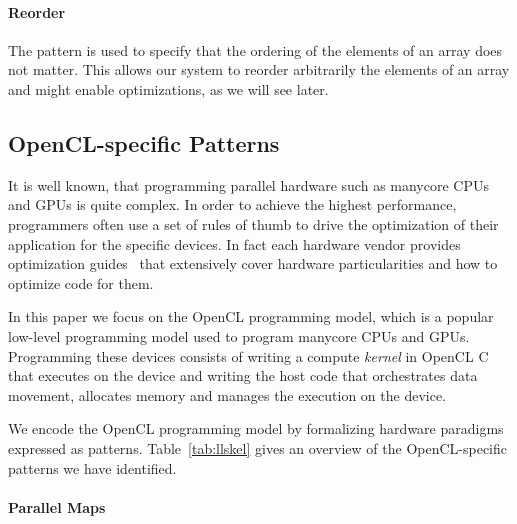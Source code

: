 \paragraph{Reorder}

The  pattern is used to specify that the ordering of the elements of an array does not matter.
This allows our system to reorder arbitrarily the elements of an array and might enable optimizations, as we will see later.



\subsection{OpenCL-specific Patterns}

It is well known, that programming parallel hardware such as manycore CPUs and GPUs is quite complex.
In order to achieve the highest performance, programmers often use a set of rules of thumb to drive the optimization of their application for the specific devices.
In fact each hardware vendor provides optimization guides~\cite{nvidia11guide,amd12guide} that extensively cover hardware particularities and how to optimize code for them.

In this paper we focus on the OpenCL programming model, which is a popular low-level programming model used to program manycore CPUs and GPUs.
Programming these devices consists of writing a compute \emph{kernel} in OpenCL C that executes on the device and writing the host code that orchestrates data movement, allocates memory and manages the execution on the device.

We encode the OpenCL programming model by formalizing hardware paradigms expressed as patterns.
Table~\ref{tab:llskel} gives an overview of the OpenCL-specific patterns we have identified.

\paragraph{Parallel Maps}

